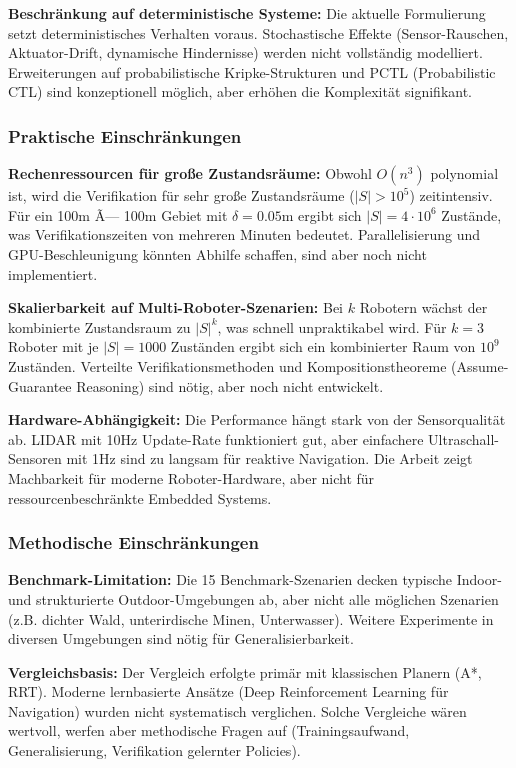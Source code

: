 ﻿\documentclass[a4paper,12pt]{article}
\theoremstyle{definition}
\begin{document}
\textbf{Beschränkung auf deterministische Systeme:}
Die aktuelle Formulierung setzt deterministisches Verhalten voraus. Stochastische Effekte (Sensor-Rauschen, Aktuator-Drift, dynamische Hindernisse) werden nicht vollständig modelliert. Erweiterungen auf probabilistische Kripke-Strukturen und PCTL (Probabilistic CTL) sind konzeptionell möglich, aber erhöhen die Komplexität signifikant.

\subsubsection{Praktische Einschränkungen}

\textbf{Rechenressourcen für große Zustandsräume:}
Obwohl $O(n^3)$ polynomial ist, wird die Verifikation für sehr große Zustandsräume ($|S| > 10^5$) zeitintensiv. Für ein 100m Ã— 100m Gebiet mit $\delta = 0.05$m ergibt sich $|S| = 4 \cdot 10^6$ Zustände, was Verifikationszeiten von mehreren Minuten bedeutet. Parallelisierung und GPU-Beschleunigung könnten Abhilfe schaffen, sind aber noch nicht implementiert.

\textbf{Skalierbarkeit auf Multi-Roboter-Szenarien:}
Bei $k$ Robotern wächst der kombinierte Zustandsraum zu $|S|^k$, was schnell unpraktikabel wird. Für $k = 3$ Roboter mit je $|S| = 1000$ Zuständen ergibt sich ein kombinierter Raum von $10^9$ Zuständen. Verteilte Verifikationsmethoden und Kompositionstheoreme (Assume-Guarantee Reasoning) sind nötig, aber noch nicht entwickelt.

\textbf{Hardware-Abhängigkeit:}
Die Performance hängt stark von der Sensorqualität ab. LIDAR mit 10Hz Update-Rate funktioniert gut, aber einfachere Ultraschall-Sensoren mit 1Hz sind zu langsam für reaktive Navigation. Die Arbeit zeigt Machbarkeit für moderne Roboter-Hardware, aber nicht für ressourcenbeschränkte Embedded Systems.

\subsubsection{Methodische Einschränkungen}

\textbf{Benchmark-Limitation:}
Die 15 Benchmark-Szenarien decken typische Indoor- und strukturierte Outdoor-Umgebungen ab, aber nicht alle möglichen Szenarien (z.B. dichter Wald, unterirdische Minen, Unterwasser). Weitere Experimente in diversen Umgebungen sind nötig für Generalisierbarkeit.

\textbf{Vergleichsbasis:}
Der Vergleich erfolgte primär mit klassischen Planern (A*, RRT). Moderne lernbasierte Ansätze (Deep Reinforcement Learning für Navigation) wurden nicht systematisch verglichen. Solche Vergleiche wären wertvoll, werfen aber methodische Fragen auf (Trainingsaufwand, Generalisierung, Verifikation gelernter Policies).
\end{document}
